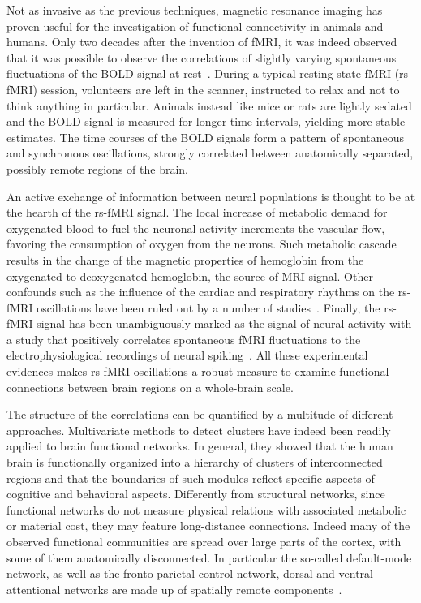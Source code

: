 Not as invasive as the previous techniques, magnetic resonance imaging has proven useful for the investigation of functional connectivity in animals and humans.
Only two decades after the invention of fMRI, it was indeed observed that it was possible to observe the correlations of slightly varying spontaneous fluctuations of the BOLD signal at rest~\cite{biswal2012}. During a typical resting state fMRI (rs-fMRI) session, volunteers are left in the scanner, instructed to relax and not to think anything in particular. 
Animals instead like mice or rats are lightly sedated and the BOLD signal is measured for longer time intervals, yielding more stable estimates.
The time courses of the BOLD signals form a pattern of spontaneous and synchronous oscillations, strongly correlated between anatomically separated, possibly remote regions of the brain.

An active exchange of information between neural populations is thought to be at the hearth of the rs-fMRI signal. The local increase of metabolic demand for oxygenated blood to fuel the neuronal activity increments the vascular flow, favoring the consumption of oxygen from the neurons. Such metabolic cascade results in the change of the magnetic properties of hemoglobin from the oxygenated to deoxygenated hemoglobin, the source of MRI signal. Other confounds such as the influence of the cardiac and respiratory rhythms on the rs-fMRI oscillations have been ruled out by a number of studies~\cite{cordes2000,cordes2001}.
Finally, the rs-fMRI signal has been unambiguously marked as the signal of neural activity with a study that positively correlates spontaneous fMRI fluctuations to the electrophysiological recordings of neural spiking~\cite{shmuel2002}. All these experimental evidences makes rs-fMRI oscillations a robust measure to examine functional connections between brain regions on a whole-brain scale.

The structure of the correlations can be quantified by a multitude of different approaches. 
Multivariate methods to detect clusters have indeed been readily applied to brain functional networks.
In general, they showed that the human brain is functionally organized into a hierarchy of clusters of interconnected regions and that the boundaries of such modules reflect specific aspects of cognitive and behavioral aspects.
Differently from structural networks, since functional networks do not measure physical relations with associated metabolic or material cost, they may feature long-distance connections.
Indeed many of the observed functional communities are spread over large parts of the cortex, with some of them anatomically disconnected.
In particular the so-called default-mode network, as well as the fronto-parietal control network, dorsal and ventral attentional networks are made up of spatially remote components~\cite{power2011}.

